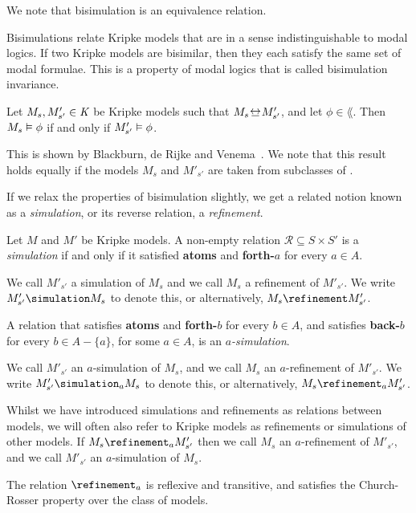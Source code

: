 We note that bisimulation is an equivalence relation.

Bisimulations relate Kripke models that are in a sense indistinguishable to
modal logics. If two Kripke models are bisimilar, then they each satisfy the
same set of modal formulae. This is a property of modal logics that is called
bisimulation invariance.

\begin{lemma}
Let $M_s, M'_{s'} \in \textit{K}$ be Kripke models such that $M_s \bisim M'_{s'}$,
and let $\phi \in \lang$. Then $M_s \vDash \phi$ if and only if $M'_{s'}
\vDash \phi$.
\end{lemma}

This is shown by Blackburn, de Rijke and Venema~\cite{blackburn2002modal}. We
note that this result holds equally if the models $M_s$ and $M'_{s'}$ are taken
from subclasses of \classK{}.

If we relax the properties of bisimulation slightly, we get a related notion
known as a {\em simulation}, or its reverse relation, a {\em refinement}.

\begin{definition}
Let $M$ and $M'$ be Kripke models. A non-empty relation $\mathcal{R}
\subseteq S \times S'$ is a \textit{simulation} if and only if it satisfied {\bf
atoms} and {\bf forth-$a$} for every $a \in A$.

We call $M'_{s'}$ a simulation of $M_s$ and we call $M_s$ a refinement of
$M'_{s'}$. We write $M'_{s'} \simulation M_s$ to denote this, or alternatively,
$M_s \refinement M'_{s'}$.

A relation that satisfies {\bf atoms} and {\bf forth-$b$} for every $b \in A$,
and satisfies {\bf back-$b$} for every $b \in A - \{a\}$, for some $a \in A$, is
an $a$\textit{-simulation}. 

We call $M'_{s'}$ an $a$-simulation of $M_s$, and we call $M_s$ an
$a$-refinement of $M'_{s'}$. We write $M'_{s'} \simulation_a M_s$ to denote
this, or alternatively, $M_s \refinement_a M'_{s'}$.
\end{definition}

Whilst we have introduced simulations and refinements as relations between
models, we will often also refer to Kripke models as refinements or simulations
of other models. If $M_s \refinement_a M'_{s'}$ then we call $M_s$ an
$a$-refinement of $M'_{s'}$, and we call $M'_{s'}$ an $a$-simulation of $M_s$.

\begin{lemma}
The relation $\refinement_a$ is reflexive and transitive, and satisfies the
Church-Rosser property over the class of \classK{} models.
\end{lemma}

